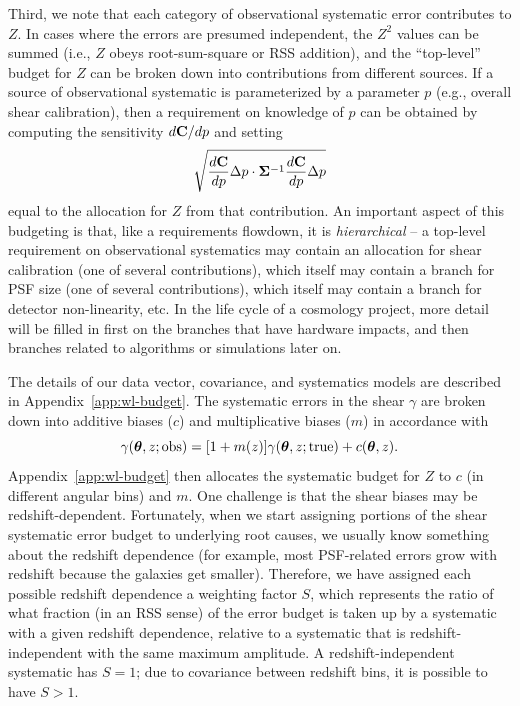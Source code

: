 \documentclass[aps,prd, amsmath,amssymb,superscriptaddress,showkeys,nofootinbib,reprint,preprintnumbers]{revtex4-1}
\begin{document}
Third, we note that each category of observational systematic error contributes to $Z$. In cases where the errors are presumed independent, the $Z^2$ values can be summed (i.e., $Z$ obeys root-sum-square or RSS addition), and the ``top-level'' budget for $Z$ can be broken down into contributions from different sources. If a source of observational systematic is parameterized by a parameter $p$ (e.g., overall shear calibration), then a requirement on knowledge of $p$ can be obtained by computing the sensitivity $d{\bf C}/dp$ and setting
\begin{equation}
\sqrt{\frac{d{\bf C}}{dp} \Delta p \cdot {\boldsymbol\Sigma}^{-1} \frac{d{\bf C}}{dp} \Delta p}
\end{equation}
equal to the allocation for $Z$ from that contribution. An important aspect of this budgeting is that, like a requirements flowdown, it is {\em hierarchical} -- a top-level requirement on observational systematics may contain an allocation for shear calibration (one of several contributions), which itself may contain a branch for PSF size (one of several contributions), which itself may contain a branch for detector non-linearity, etc. In the life cycle of a cosmology project, more detail will be filled in first on the branches that have hardware impacts, and then branches related to algorithms or simulations later on.

The details of our data vector, covariance, and systematics models are described in Appendix~\ref{app:wl-budget}. The systematic errors in the shear $\gamma$ are broken down into additive biases ($c$) and multiplicative biases ($m$) in accordance with
\begin{equation}
\gamma({\boldsymbol\theta},z;{\rm obs}) = [1+m(z)] \gamma({\boldsymbol\theta},z;{\rm true}) + c({\boldsymbol\theta},z).
\label{eq:gmod}
\end{equation}
Appendix~\ref{app:wl-budget} then allocates the systematic budget for $Z$ to $c$ (in different angular bins) and $m$. One challenge is that the shear biases may be redshift-dependent. Fortunately, when we start assigning portions of the shear systematic error budget to underlying root causes, we usually know something about the redshift dependence (for example, most PSF-related errors grow with redshift because the galaxies get smaller). Therefore, we have assigned each possible redshift dependence a weighting factor $S$, which represents the ratio of what fraction (in an RSS sense) of the error budget is taken up by a systematic with a given redshift dependence, relative to a systematic that is redshift-independent with the same maximum amplitude. A redshift-independent systematic has $S=1$; due to covariance between redshift bins, it is possible to have $S>1$.
\end{document}
